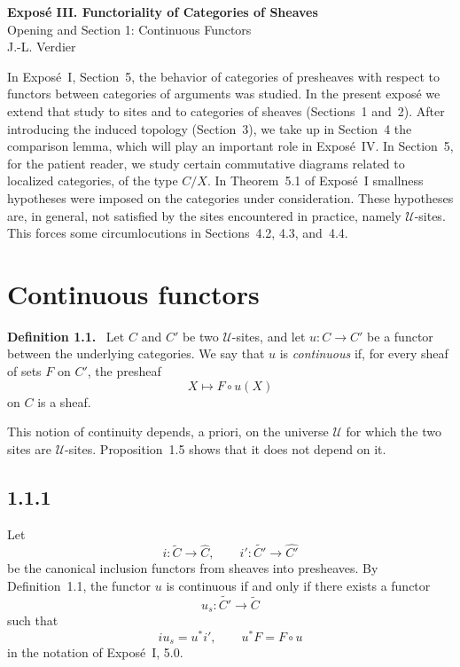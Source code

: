 \documentclass[11pt]{article}
\newcommand{\U}{\mathcal{U}}
\newenvironment{statement}[1]{\par\medskip\noindent\textbf{#1.}\ }{\par\medskip}
\begin{document}
\begin{center}
{\Large \textbf{Expos\'e III. Functoriality of Categories of Sheaves}}\\[0.35em]
{\large Opening and Section 1: Continuous Functors}\\[0.35em]
J.-L. Verdier
\end{center}

\bigskip


\bigskip

In Expos\'e~I, Section~5, the behavior of categories of presheaves with respect to functors between categories of arguments was studied. In the present expos\'e we extend that study to sites and to categories of sheaves (Sections~1 and~2). After introducing the induced topology (Section~3), we take up in Section~4 the comparison lemma, which will play an important role in Expos\'e~IV. In Section~5, for the patient reader, we study certain commutative diagrams related to localized categories, of the type \(C/X\). In Theorem~5.1 of Expos\'e~I smallness hypotheses were imposed on the categories under consideration. These hypotheses are, in general, not satisfied by the sites encountered in practice, namely \(\U\)-sites. This forces some circumlocutions in Sections~4.2, 4.3, and~4.4.

\section{Continuous functors}

\begin{statement}{Definition 1.1}
Let \(C\) and \(C'\) be two \(\U\)-sites, and let
\(u:C\to C'\) be a functor between the underlying categories. We say that \(u\) is \emph{continuous} if, for every sheaf of sets \(F\) on \(C'\), the presheaf
\[
X\longmapsto F\circ u(X)
\]
on \(C\) is a sheaf.
\end{statement}

This notion of continuity depends, a priori, on the universe \(\U\) for which the two sites are \(\U\)-sites. Proposition~1.5 shows that it does not depend on it.

\subsection*{1.1.1}
Let
\[
i:\widetilde C\longrightarrow \widehat C,
\qquad
 i':\widetilde {C'}\longrightarrow \widehat {C'}
\]
be the canonical inclusion functors from sheaves into presheaves. By Definition~1.1, the functor \(u\) is continuous if and only if there exists a functor
\[
u_s:\widetilde {C'}\longrightarrow \widetilde C
\]
such that
\[
 i u_s=u^* i',\qquad u^*F=F\circ u
\]
in the notation of Expos\'e~I, 5.0.
\end{document}
